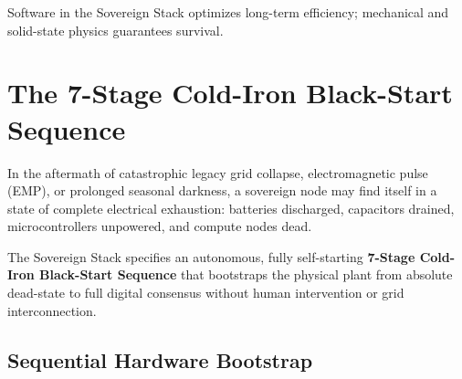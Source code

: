 Software in the Sovereign Stack optimizes long-term efficiency; mechanical and solid-state physics guarantees survival.

\section{The 7-Stage Cold-Iron Black-Start Sequence}

In the aftermath of catastrophic legacy grid collapse, electromagnetic pulse (EMP), or prolonged seasonal darkness, a sovereign node may find itself in a state of complete electrical exhaustion: batteries discharged, capacitors drained, microcontrollers unpowered, and compute nodes dead.

The Sovereign Stack specifies an autonomous, fully self-starting \textbf{7-Stage Cold-Iron Black-Start Sequence} that bootstraps the physical plant from absolute dead-state to full digital consensus without human intervention or grid interconnection.

\subsection{Sequential Hardware Bootstrap}

